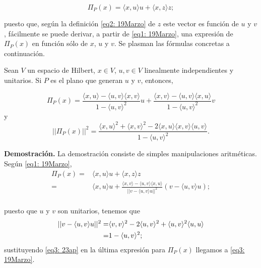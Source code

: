 \begin{equation}
\label{eq1: 19Marzo}
\Pi_{P}(x)= \langle x, u \rangle u + \langle x, z \rangle z;
\end{equation}

\noindent
puesto que, según la definición \eqref{eq2: 19Marzo} de 
$z$ este vector es función de $u$ y $v$, fácilmente se
puede derivar, a partir de \eqref{eq1: 19Marzo},
una expresión de $\Pi_{P}(x)$ en función sólo
de $x$, $u$ y $v$. Se plasman las fórmulas 
concretas a continuación.
	\begin{prop}
	\label{prop: formulas 20Marzo}
	Sean $V$ un espacio de Hilbert, $x \in V$,
	$u,v \in V$ linealmente independientes
	y unitarios. Si $P$ es el plano
	que generan $u$ y $v$, entonces,

		\begin{equation}
		\label{eq3: 19Marzo}
		\Pi_{P}(x)= \frac{\langle x, u \rangle -\langle u, v \rangle \langle x, v \rangle }{1-\langle u, v \rangle^{2}} u + \frac{\langle x, v \rangle -\langle u, v \rangle \langle x, u \rangle }{1-\langle u, v \rangle^{2}} v
		\end{equation}
	y 
		\begin{equation}
		\label{eq3: 19Marzo}
		  || \Pi_{P}(x) ||^{2}=
		  \frac{\langle x, u \rangle^{2} +  \langle x, v \rangle^{2}	
	       -2  \langle x, u \rangle \langle x, v \rangle \langle u, v \rangle	}{1- \langle u, v 		\rangle^{2}}.
		\end{equation}
 
	\end{prop}

\noindent
\textbf{Demostración.}
La demostración consiste de simples manipulaciones aritméticas.
Según \eqref{eq1: 19Marzo},
\begin{align*}
\Pi_{P}(x) = & \langle x, u \rangle u + \langle x, z \rangle z \\
 = & \langle x, u \rangle u
 + \frac{\langle x, v \rangle - \langle u, v \rangle \langle x, u \rangle}{|| v -\langle u,v \rangle u ||^{2}}
(v - \langle u,v \rangle u);\\
\end{align*}

\noindent
puesto que $u$ y $v$ son unitarios, 
tenemos que
\begin{align}
\label{eq3: 23ap}
|| v -\langle u,v \rangle u ||^{2} = & 
\langle v,v \rangle^{2} -2
\langle u,v \rangle^{2} +\langle u,v \rangle^{2}\langle u,u \rangle \notag  \\
= & 1 -\langle u,v \rangle^{2}; 
\end{align}
sustituyendo \eqref{eq3: 23ap} en la última expresión para 
$\Pi_{P}(x)$ llegamos a \eqref{eq3: 19Marzo}. \\

